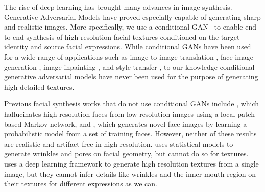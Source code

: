 The rise of deep learning has brought many advances in image synthesis. Generative Adversarial Models \cite{gan} have proved especially capable of generating sharp and realistic images. 
More specifically, we use a conditional GAN~\cite{cgan} to enable end-to-end synthesis of high-resolution facial textures conditioned on the target identity and source facial expressions. While conditional GANs have been used for a wide range of applications such as image-to-image translation \cite{pix2pix}, face image generation \cite{gauthier2014}, image inpainting \cite{pathak2016context, yang2016high}, and style transfer \cite{li2016precomputed}, to our knowledge conditional generative adversarial models have never been used for the purpose of generating high-detailed textures.

Previous facial synthesis works that do not use conditional GANs include  \cite{liu2007face}, which hallucinates high-resolution faces from low-resolution images using a local patch-based Markov network, and
\cite{mohammed2009visio}, which generates novel face images by learning a probabilistic model from a set of training faces. 
However, neither of these results are realistic and artifact-free in high-resolution. \cite{golovinskiy2006statistical} uses statistical models to generate wrinkles and pores on facial geometry, but cannot do so for textures. \cite{saito2016} uses a deep learning framework to generate high resolution textures from a single image, but they cannot infer details like wrinkles and the inner mouth region on their textures for different expressions as we can.
